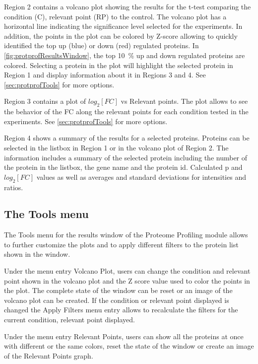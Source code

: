 Region \num{2} contains a volcano plot showing the results for the t-test comparing the condition (C), relevant point (RP) to the control. The volcano plot has a horizontal line indicating the significance level selected for the experiments. In addition, the points in the plot can be colored by Z-score allowing to quickly identified the top up (blue) or down (red) regulated proteins. In \autoref{fig:protprofResultsWindow}, the top \SI{10}{\percent} up and down regulated proteins are colored. Selecting a protein in the plot will highlight the selected protein in Region \num{1} and display information about it in Regions \num{3} and \num{4}. See \autoref{sec:protprofTools} for more options.

Region \num{3} contains a plot of $log_2[FC]$ vs Relevant points. The plot allows to see the behavior of the FC along the relevant points for each condition tested in the experiments. See \autoref{sec:protprofTools} for more options.

Region \num{4} shows a summary of the results for a selected proteins. Proteins can be selected in the listbox in Region \num{1} or in the volcano plot of Region \num{2}. The information includes a summary of the selected protein including the number of the protein in the listbox, the gene name and the protein id. Calculated p and $log_2[FC]$ values as well as averages and standard deviations for intensities and ratios.

\subsection{The Tools menu}
\label{sec:protprofTools}

The Tools menu for the results window of the Proteome Profiling module allows to further customize the plots and to apply different filters to the protein list shown in the window.

Under the menu entry Volcano Plot, users can change the condition and relevant point shown in the volcano plot and the Z score value used to color the points in the plot. The complete state of the window can be reset or an image of the volcano plot can be created. If the condition or relevant point displayed is changed the Apply Filters menu entry allows to recalculate the filters for the current condition, relevant point displayed.

Under the menu entry Relevant Points, users can show all the proteins at once with different or the same colors, reset the state of the window or create an image of the Relevant Points graph.

